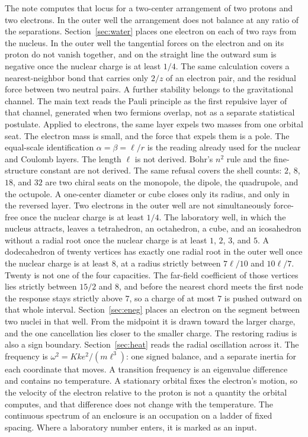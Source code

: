 \documentclass[a4paper]{article}
\begin{document}
The note computes that locus for a two-center arrangement of two protons and two electrons. In the outer well the arrangement does not balance at any ratio of the separations. Section~\ref{sec:water} places one electron on each of two rays from the nucleus. In the outer well the tangential forces on the electron and on its proton do not vanish together, and on the straight line the outward sum is negative once the nuclear charge is at least \(1/4\). The same calculation covers a nearest-neighbor bond that carries only \(2/z\) of an electron pair, and the residual force between two neutral pairs. A further stability belongs to the gravitational channel. The main text reads the Pauli principle as the first repulsive layer of that channel, generated when two fermions overlap, not as a separate statistical postulate. Applied to electrons, the same layer expels two masses from one orbital seat. The electron mass is small, and the force that expels them is a pole. The equal-scale identification \(\alpha=\beta=\ell/r\) is the reading already used for the nuclear and Coulomb layers. The length \(\ell\) is not derived. Bohr's \(n^{2}\) rule and the fine-structure constant are not derived. The same refusal covers the shell counts: \(2\), \(8\), \(18\), and \(32\) are two chiral seats on the monopole, the dipole, the quadrupole, and the octupole. A one-center diameter or cube closes only its radius, and only in the reversed layer. Two electrons in the outer well are not simultaneously force-free once the nuclear charge is at least \(1/4\). The laboratory well, in which the nucleus attracts, leaves a tetrahedron, an octahedron, a cube, and an icosahedron without a radial root once the nuclear charge is at least \(1\), \(2\), \(3\), and \(5\). A dodecahedron of twenty vertices has exactly one radial root in the outer well once the nuclear charge is at least \(8\), at a radius strictly between \(7\ell/10\) and \(10\ell/7\). Twenty is not one of the four capacities. The far-field coefficient of those vertices lies strictly between \(15/2\) and \(8\), and before the nearest chord meets the first node the response stays strictly above \(7\), so a charge of at most \(7\) is pushed outward on that whole interval. Section~\ref{sec:eneg} places an electron on the segment between two nuclei in that well. From the midpoint it is drawn toward the larger charge, and the one cancellation lies closer to the smaller charge. The restoring radius is also a sign boundary. Section~\ref{sec:heat} reads the radial oscillation across it. The frequency is \(\omega^{2}=K k e^{2}/(m\ell^{3})\): one signed balance, and a separate inertia for each coordinate that moves. A transition frequency is an eigenvalue difference and contains no temperature. A stationary orbital fixes the electron's motion, so the velocity of the electron relative to the proton is not a quantity the orbital computes, and that difference does not change with the temperature. The continuous spectrum of an enclosure is an occupation on a ladder of fixed spacing. Where a laboratory number enters, it is marked as an input.
\end{document}
